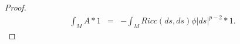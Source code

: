 \documentclass{ip-journal}
\theoremstyle{definition}
\numberwithin{equation}{section}
\begin{document}
\begin{proof}
 \begin{eqnarray}\label{myst11}
 \int_M A*1 &=&- \int_M  Ricc(ds,ds)\phi |ds|^{p-2}*1.
 \end{eqnarray} 
% 

\end{proof}
\end{document}
